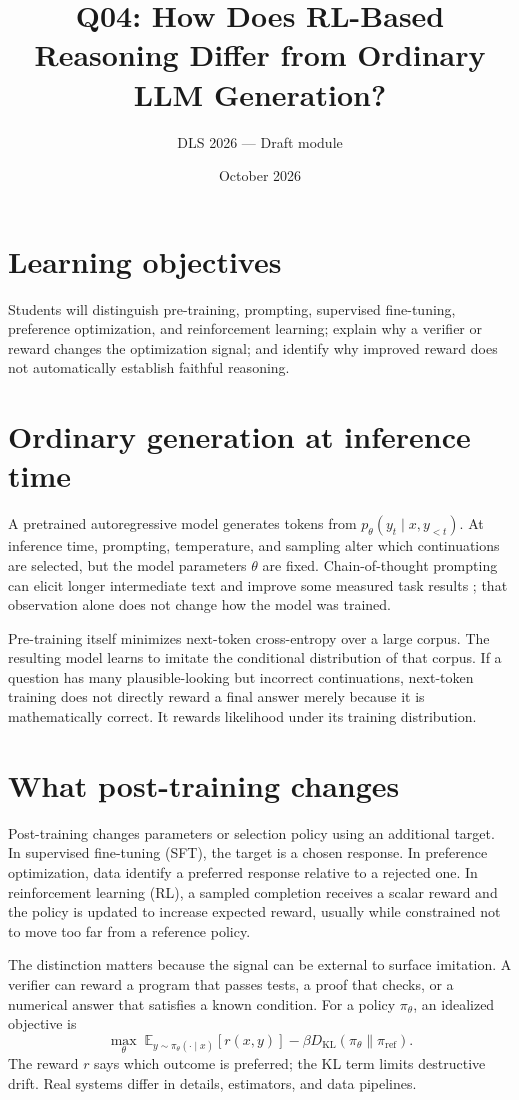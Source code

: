 \documentclass[11pt]{article}
\title{Q04: How Does RL-Based Reasoning Differ from Ordinary LLM Generation?}
\author{DLS 2026 --- Draft module}\date{October 2026}
\begin{document}
\maketitle
\section*{Learning objectives}
Students will distinguish pre-training, prompting, supervised fine-tuning, preference optimization, and reinforcement learning; explain why a verifier or reward changes the optimization signal; and identify why improved reward does not automatically establish faithful reasoning.

\section{Ordinary generation at inference time}
A pretrained autoregressive model generates tokens from $p_\theta(y_t\mid x,y_{<t})$. At inference time, prompting, temperature, and sampling alter which continuations are selected, but the model parameters $\theta$ are fixed. Chain-of-thought prompting can elicit longer intermediate text and improve some measured task results \cite{wei2022chain}; that observation alone does not change how the model was trained.

Pre-training itself minimizes next-token cross-entropy over a large corpus. The resulting model learns to imitate the conditional distribution of that corpus. If a question has many plausible-looking but incorrect continuations, next-token training does not directly reward a final answer merely because it is mathematically correct. It rewards likelihood under its training distribution.

\section{What post-training changes}
Post-training changes parameters or selection policy using an additional target. In supervised fine-tuning (SFT), the target is a chosen response. In preference optimization, data identify a preferred response relative to a rejected one. In reinforcement learning (RL), a sampled completion receives a scalar reward and the policy is updated to increase expected reward, usually while constrained not to move too far from a reference policy.

The distinction matters because the signal can be external to surface imitation. A verifier can reward a program that passes tests, a proof that checks, or a numerical answer that satisfies a known condition. For a policy $\pi_\theta$, an idealized objective is
\[
\max_\theta\;\mathbb E_{y\sim\pi_\theta(\cdot\mid x)}[r(x,y)]-\beta D_{\mathrm{KL}}(\pi_\theta\|\pi_{\mathrm{ref}}).
\]
The reward $r$ says which outcome is preferred; the KL term limits destructive drift. Real systems differ in details, estimators, and data pipelines.
\end{document}
